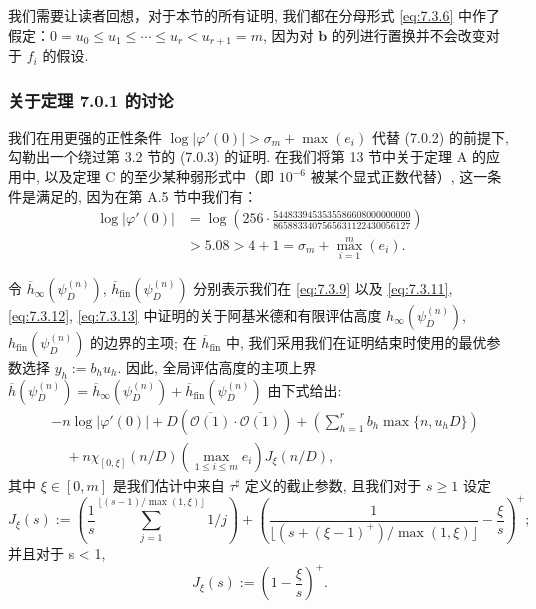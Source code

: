 我们需要让读者回想，对于本节的所有证明, 我们都在分母形式 \eqref{eq:7.3.6} 中作了假定：\(0 = u_0 \le u_1 \le \cdots \le u_r < u_{r+1} = m\), 
因为对 \(\mathbf{b}\) 的列进行置换并不会改变对于 \(f_i\) 的假设.

\subsubsection{关于定理 7.0.1 的讨论}\label{sec:7.7.1}

我们在用更强的正性条件 \(\log |\varphi'(0)| > \sigma_m + \max(e_i)\) 代替 (7.0.2) 的前提下, 
勾勒出一个绕过第 3.2 节的 (7.0.3) 的证明. 
在我们将第 13 节中关于定理 A 的应用中, 以及定理 C 的至少某种弱形式中（即 \(10^{-6}\) 被某个显式正数代替）, 
这一条件是满足的, 因为在第 A.5 节中我们有：
\[
\begin{aligned}
\log |\varphi'(0)| 
&= \log \left(256 \cdot \frac{5448339453535586608000000000}{8658833407565631122430056127}\right) \\
&> 5.08 > 4 + 1 = \sigma_m + \max_{i=1}^{m}(e_i).
\end{aligned}
\]

令 \(\overline{h}_{\infty}(\psi_D^{(n)})\), \(\overline{h}_{\text{fin}}(\psi_D^{(n)})\) 
分别表示我们在 \eqref{eq:7.3.9} 以及 \eqref{eq:7.3.11}, \eqref{eq:7.3.12}, \eqref{eq:7.3.13} 
中证明的关于阿基米德和有限评估高度 \(h_{\infty}(\psi_D^{(n)})\), \(h_{\text{fin}}(\psi_D^{(n)})\) 的边界的主项; 
在 \(\overline{h}_{\text{fin}}\) 中, 我们采用我们在证明结束时使用的最优参数选择 \(y_h := b_h u_h\). 
因此, 全局评估高度的主项上界 \(\overline{h}(\psi_D^{(n)}) = \overline{h}_{\infty}(\psi_D^{(n)}) + \overline{h}_{\text{fin}}(\psi_D^{(n)})\) 由下式给出:
\begin{equation}\label{eq:7.7.2}
\begin{aligned}
&- n \log |\varphi'(0)| + D\left(\overline{\mathcal{O}(1)} \cdot \overline{\mathcal{O}(1)}\right) + \left(\sum_{h=1}^{r} b_h \max\{n, u_h D\}\right) \\
&\quad + n \chi_{[0,\xi]}(n/D) \left(\max_{1 \le i \le m} e_i\right) J_{\xi}(n/D),
\end{aligned}
\end{equation}
其中 \(\xi \in [0, m]\) 是我们估计中来自 \(\tau^{\sharp}\) 定义的截止参数, 
且我们对于 \(s \geq 1\) 设定
\[ J_{\xi}(s) := \left(\frac{1}{s} \sum_{j=1}^{\lfloor (s-1)/\max(1,\xi) \rfloor} 1/j\right) + \left(\frac{1}{\lfloor (s+(\xi-1)^{+})/\max(1,\xi) \rfloor} - \frac{\xi}{s}\right)^{+}; \]
并且对于 s < 1,
\[ J_{\xi}(s) := \left(1 - \frac{\xi}{s}\right)^{+}. \]


